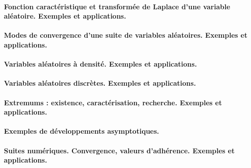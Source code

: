 \paragraph{Fonction caractéristique et transformée de Laplace d'une variable aléatoire. Exemples et applications.}
\paragraph{Modes de convergence d’une suite de variables aléatoires. Exemples et applications.}
\paragraph{Variables aléatoires à densité. Exemples et applications.}
\paragraph{Variables aléatoires discrètes. Exemples et applications.}
\paragraph{Extremums : existence, caractérisation, recherche. Exemples et applications.}
\paragraph{Exemples de développements asymptotiques.}
\paragraph{Suites numériques. Convergence, valeurs d'adhérence. Exemples et applications.}

